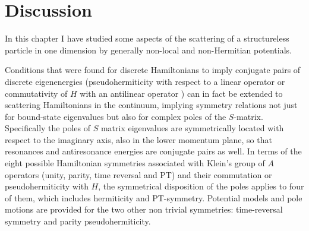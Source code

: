 \section{Discussion}
\label{sec:chapter2_Discussion}

In this chapter I have studied some aspects of the scattering of a structureless particle in one dimension by
generally non-local and non-Hermitian potentials.

Conditions that were found for discrete Hamiltonians to imply conjugate pairs of discrete eigenenergies
(pseudohermiticity with respect to a linear operator or commutativity of $H$ with an antilinear operator \cite{Mostafazadeh2002,Mostafazadeh2002a,Mostafazadeh2002b}) can in fact be extended to scattering Hamiltonians in the continuum, implying symmetry relations not just for bound-state eigenvalues
but also for complex
poles of the $S$-matrix. Specifically the poles of $S$ matrix eigenvalues
are symmetrically located with respect to the imaginary axis, also in the lower momentum plane, so that resonances and antiresonance
energies are conjugate pairs as well.
In  terms of the eight possible Hamiltonian symmetries associated with Klein's group of $A$ operators (unity, parity, time reversal and PT)
and their commutation or pseudohermiticity with $H$,
the symmetrical disposition of the poles applies to four of them, which includes hermiticity and PT-symmetry. Potential models
and pole motions are provided for the
two other non trivial symmetries: time-reversal symmetry and parity pseudohermiticity.

